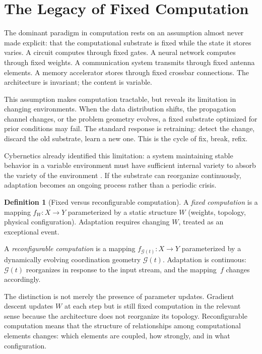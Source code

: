 \documentclass[11pt, a4paper]{article}
\theoremstyle{definition}
\newtheorem{definition}{Definition}
\theoremstyle{remark}
\begin{document}
\section{The Legacy of Fixed Computation}

The dominant paradigm in computation rests on an assumption almost never
made explicit: that the computational substrate is fixed while the state it
stores varies. A circuit computes through fixed gates. A neural network
computes through fixed weights. A communication system transmits through
fixed antenna elements. A memory accelerator stores through fixed crossbar
connections. The architecture is invariant; the content is variable.

This assumption makes computation tractable, but reveals its limitation in
changing environments. When the data distribution shifts, the propagation
channel changes, or the problem geometry evolves, a fixed substrate
optimized for prior conditions may fail. The standard response is retraining:
detect the change, discard the old substrate, learn a new one. This is the
cycle of fix, break, refix.

Cybernetics already identified this limitation: a system maintaining stable
behavior in a variable environment must have sufficient internal variety to
absorb the variety of the environment \cite{ashby1956}. If the substrate
can reorganize continuously, adaptation becomes an ongoing process rather
than a periodic crisis.

\begin{definition}[Fixed versus reconfigurable computation]
A \textit{fixed computation} is a mapping $f_W: X \to Y$ parameterized by
a static structure $W$ (weights, topology, physical configuration). Adaptation
requires changing $W$, treated as an exceptional event.

A \textit{reconfigurable computation} is a mapping $f_{\mathcal{G}(t)}: X
\to Y$ parameterized by a dynamically evolving coordination geometry
$\mathcal{G}(t)$. Adaptation is continuous: $\mathcal{G}(t)$ reorganizes
in response to the input stream, and the mapping~$f$ changes accordingly.
\end{definition}

The distinction is not merely the presence of parameter updates. Gradient
descent updates $W$ at each step but is still fixed computation in the
relevant sense because the architecture does not reorganize its topology.
Reconfigurable computation means that the structure of relationships among
computational elements changes: which elements are coupled, how strongly,
and in what configuration.
\end{document}
